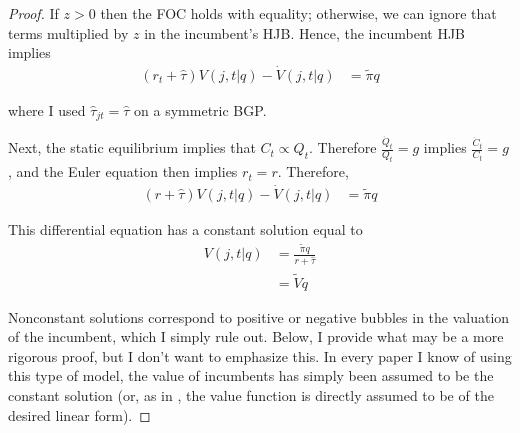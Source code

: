 \documentclass[11pt,english]{article}
\begin{document}
\begin{proof}
	If $z > 0$ then the FOC holds with equality; otherwise, we can ignore that terms multiplied by $z$ in the incumbent's HJB. Hence, the incumbent HJB implies
	\begin{align}
	(r_t + \hat{\tau}) V(j,t|q) - \dot{V}(j,t|q) &= \tilde{\pi} q
	\end{align}
	
	where I used $\hat{\tau}_{jt} = \hat{\tau}$ on a symmetric BGP.
	
	Next, the static equilibrium implies that $C_t \propto Q_t$. Therefore $\frac{\dot{Q}_t}{Q_t} = g$ implies $\frac{\dot{C}_t}{C_t} = g$, and the Euler equation then implies $r_t = r$. Therefore, 
	\begin{align}
	(r + \hat{\tau}) V(j,t|q) - \dot{V}(j,t|q) &= \tilde{\pi} q
	\end{align}
	
	This differential equation has a constant solution equal to 
	\begin{align}
	V(j,t|q) &= \frac{\tilde{\pi} q}{r + \hat{\tau}} \\
	&= \tilde{V} q 
	\end{align}
	
	Nonconstant solutions correspond to positive or negative bubbles in the valuation of the incumbent, which I simply rule out. Below, I provide what may be a more rigorous proof, but I don't want to emphasize this. In every paper I know of using this type of model, the value of incumbents has simply been assumed to be the constant solution (or, as in \cite{acemoglu_innovation_2015}, the value function is directly assumed to be of the desired linear form).
\end{proof}
\end{document}
